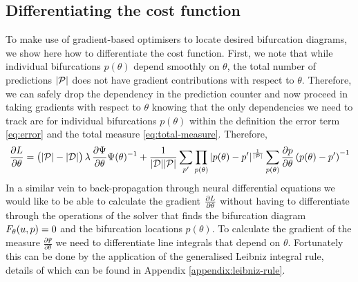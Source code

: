 \documentclass{article}
\begin{document}
\subsection{Differentiating the cost function}

To make use of gradient-based optimisers to locate desired bifurcation diagrams, we show here how to differentiate the cost function. First, we note that while individual bifurcations $p(\theta)$ depend smoothly on $\theta$, the total number of predictions $|\mathcal{P}|$ does not have gradient contributions with respect to $\theta$. Therefore, we can safely drop the dependency in the prediction counter and now proceed in taking gradients with respect to $\theta$ knowing that the only dependencies we need to track are for individual bifurcations $p(\theta)$ within the definition the error term \eqref{eq:error} and the total measure \eqref{eq:total-measure}. Therefore, 
\begin{align}
    \frac{\partial L}{\partial\theta}=
    \big(|\mathcal{P}|-|\mathcal{D}|\big)\,\lambda\,
    \frac{\partial \Psi}{\partial\theta}\Psi(\theta)^{-1}+
    \frac{1}{|\mathcal{D}||\mathcal{P}|}\sum_{p'}
    \prod_{p(\theta)}|p(\theta)-p'|^{\frac{1}{|\mathcal{P}|}}
    \sum_{p(\theta)}\frac{\partial p}{\partial\theta}\left(p(\theta)-p'\right)^{-1}
    \label{eq:gradient-loss}
\end{align}
In a similar vein to back-propagation through neural differential equations \cite{Chen2018NeuralEquations} we would like to be able to calculate the gradient $\frac{\partial L}{\partial\theta}$ without having to differentiate through the operations of the solver that finds the bifurcation diagram $F_{\theta}(u,p)=0$ and the bifurcation locations $p(\theta)$. To calculate the gradient of the measure $\frac{\partial \Psi}{\partial\theta}$ we need to differentiate line integrals that depend on $\theta$. Fortunately this can be done by the application of the generalised Leibniz integral rule, details of which can be found in Appendix \ref{appendix:leibniz-rule}.
\end{document}
